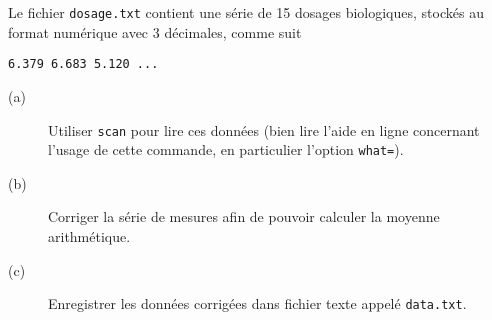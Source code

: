 \begin{exo}\label{exo:1.3}
Le fichier \texttt{dosage.txt} contient une série de 15 dosages biologiques,
stockés au format numérique avec 3 décimales, comme suit
\begin{verbatim}
6.379 6.683 5.120 ...
\end{verbatim}
\begin{description}
\item[(a)] Utiliser \verb|scan| pour lire ces données (bien lire l'aide en
  ligne concernant l'usage de cette commande, en particulier l'option
  \texttt{what=}). 
\item[(b)] Corriger la série de mesures afin de pouvoir calculer la moyenne
  arithmétique.   
\item[(c)] Enregistrer les données corrigées dans fichier texte appelé
  \texttt{data.txt}. 
\end{description}
\end{exo}

